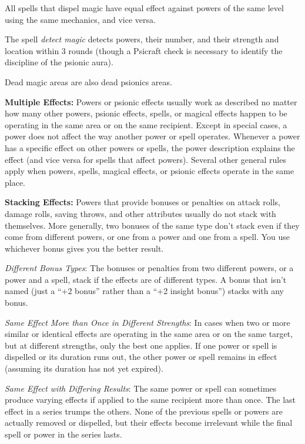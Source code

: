 \documentclass{article}
\begin{document}
All spells that dispel magic have equal effect against powers of the same level 
using the same mechanics, and vice versa.

The spell \textit{detect magic }detects powers, their number, and their strength 
and location within 3 rounds (though a Psicraft check is necessary to identify 
the discipline of the psionic aura).

Dead magic areas are also dead psionics areas.

\textbf{Multiple Effects:} Powers or psionic effects usually work as described 
no matter how many other powers, psionic effects, spells, or magical effects happen 
to be operating in the same area or on the same recipient. Except in special cases, 
a power does not affect the way another power or spell operates. Whenever a power 
has a specific effect on other powers or spells, the power description explains 
the effect (and vice versa for spells that affect powers). Several other general 
rules apply when powers, spells, magical effects, or psionic effects operate in 
the same place.

\textbf{Stacking Effects:} Powers that provide bonuses or penalties on attack rolls, 
damage rolls, saving throws, and other attributes usually do not stack with themselves. 
More generally, two bonuses of the same type don't stack even if they come from 
different powers, or one from a power and one from a spell. You use whichever bonus 
gives you the better result. 

\textit{Different Bonus Types}: The bonuses or penalties from two different powers, 
or a power and a spell, stack if the effects are of different types. A bonus that 
isn't named (just a ``+2 bonus'' rather than a ``+2 insight bonus'') stacks with 
any bonus.

\textit{Same Effect More than Once in Different Strengths}: In cases when two or 
more similar or identical effects are operating in the same area or on the same 
target, but at different strengths, only the best one applies. If one power or 
spell is dispelled or its duration runs out, the other power or spell remains in 
effect (assuming its duration has not yet expired).

\textit{Same Effect with Differing Results}: The same power or spell can sometimes 
produce varying effects if applied to the same recipient more than once. The last 
effect in a series trumps the others. None of the previous spells or powers are 
actually removed or dispelled, but their effects become irrelevant while the final 
spell or power in the series lasts.
\end{document}
